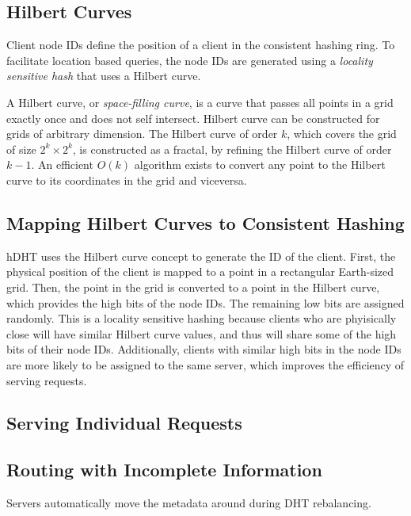 \subsection{Hilbert Curves}

Client node IDs define the position of a client in the consistent hashing ring.
To facilitate location based queries, the node IDs are generated using a \textit{locality sensitive hash} that uses a Hilbert curve.

A Hilbert curve, or \textit{space-filling curve}, is a curve that passes all points in a grid exactly once and does not self intersect.
Hilbert curve can be constructed for grids of arbitrary dimension.
The Hilbert curve of order $k$, which covers the grid of size $2^k \times 2^k$, is constructed as a fractal, by refining the Hilbert curve of order $k-1$.
An efficient $O(k)$ algorithm exists to convert any point to the Hilbert curve to its coordinates in the grid and viceversa.

\subsection{Mapping Hilbert Curves to Consistent Hashing}

hDHT uses the Hilbert curve concept to generate the ID of the client.
First, the physical position of the client is mapped to a point in a rectangular Earth-sized grid.
Then, the point in the grid is converted to a point in the Hilbert curve, which provides the high bits of the node IDs.
The remaining low bits are assigned randomly.
This is a locality sensitive hashing because clients who are phyisically close will have similar Hilbert curve values, and thus will share some of the high bits of their node IDs.
Additionally, clients with similar high bits in the node IDs are more likely to be assigned to the same server, which improves the efficiency of serving requests.


\subsection{Serving Individual Requests}

\subsection{Routing with Incomplete Information}


Servers automatically move the metadata around during DHT rebalancing.
